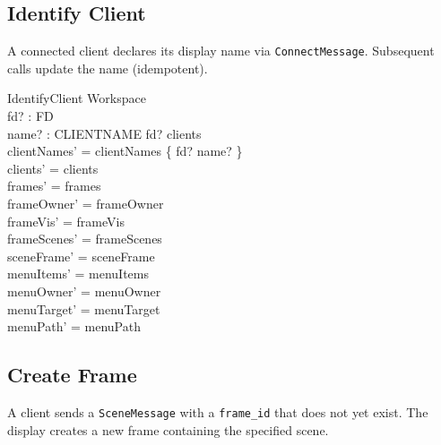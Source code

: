 \documentclass[a4paper,10pt,fleqn]{article}
\begin{document}
\subsection{Identify Client}

A connected client declares its display name via
\texttt{ConnectMessage}.  Subsequent calls update the name (idempotent).

\begin{schema}{IdentifyClient}
  \Delta Workspace \\
  fd? : FD \\
  name? : CLIENTNAME
  \where
  fd? \in clients \\
  clientNames' = clientNames \oplus \{ fd? \mapsto name? \} \\
  clients' = clients \\
  frames' = frames \\
  frameOwner' = frameOwner \\
  frameVis' = frameVis \\
  frameScenes' = frameScenes \\
  sceneFrame' = sceneFrame \\
  menuItems' = menuItems \\
  menuOwner' = menuOwner \\
  menuTarget' = menuTarget \\
  menuPath' = menuPath
\end{schema}

\subsection{Create Frame}

A client sends a \texttt{SceneMessage} with a \texttt{frame\_id} that
does not yet exist.  The display creates a new frame containing the
specified scene.
\end{document}
